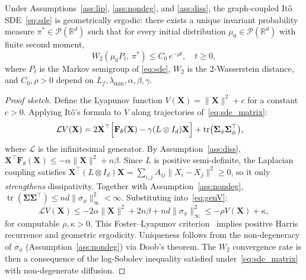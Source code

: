 \begin{theorem}
\label{thm:ergodic}
Under Assumptions~\ref{ass:lip}, \ref{ass:nondeg}, and \ref{ass:diss},
the graph-coupled It\^o SDE~\eqref{eq:sde} is geometrically ergodic: there
exists a unique invariant probability measure $\pi^* \in
\mathcal{P}(\mathbb{R}^d)$ such that for every initial distribution
$\mu_0 \in \mathcal{P}(\mathbb{R}^d)$ with finite second moment,
\begin{equation}
W_2(\mu_0 P_t,\, \pi^*) \le C_0\, e^{-\rho t},
\quad t \ge 0,
\end{equation}
where $P_t$ is the Markov semigroup of \eqref{eq:sde},
$W_2$ is the $2$-Wasserstein distance,
and $C_0, \rho > 0$ depend on $L_f, \lambda_{\min}, \alpha, \beta, \gamma$.
\end{theorem}

\begin{proof}[Proof sketch]
Define the Lyapunov function $V(\mathbf{X}) = \|\mathbf{X}\|^2 + c$ for a
constant $c > 0$.
Applying It\^o's formula to $V$ along trajectories of~\eqref{eq:sde_matrix}:
\begin{align}
\mathcal{L} V(\mathbf{X})
&= 2\mathbf{X}^\top\Bigl[\mathbf{F}_\theta(\mathbf{X})
   - \gamma(L\otimes I_d)\mathbf{X}\Bigr]
   + \operatorname{tr}\bigl(\boldsymbol{\Sigma}_\phi\boldsymbol{\Sigma}_\phi^\top\bigr),
\label{eq:genV}
\end{align}
where $\mathcal{L}$ is the infinitesimal generator.
By Assumption~\ref{ass:diss},
$\mathbf{X}^\top \mathbf{F}_\theta(\mathbf{X}) \le -\alpha\|\mathbf{X}\|^2 + n\beta$.
Since $L$ is positive semi-definite, the Laplacian coupling satisfies
$\mathbf{X}^\top(L\otimes I_d)\mathbf{X}
= \sum_{i,j} A_{ij}\|X_i - X_j\|^2 \ge 0$,
so it only \emph{strengthens} dissipativity.
Together with Assumption~\ref{ass:nondeg},
$\operatorname{tr}(\boldsymbol{\Sigma}\boldsymbol{\Sigma}^\top) \le nd \|\sigma_\phi\|_\infty^2 < \infty$.
Substituting into~\eqref{eq:genV}:
\begin{equation}
\mathcal{L} V(\mathbf{X})
\le -2\alpha\|\mathbf{X}\|^2 + 2n\beta + nd\|\sigma_\phi\|_\infty^2
\le -\rho V(\mathbf{X}) + \kappa,
\end{equation}
for computable $\rho, \kappa > 0$.
This Foster--Lyapunov criterion~\citep[Theorem~6.1]{meyn1993stability}
implies positive Harris recurrence and geometric ergodicity.
Uniqueness follows from the non-degeneracy of $\sigma_\phi$
(Assumption~\ref{ass:nondeg}) via Doob's theorem.
The $W_2$ convergence rate is then a consequence of the log-Sobolev inequality
satisfied under~\eqref{eq:sde_matrix} with non-degenerate diffusion.
\end{proof}

